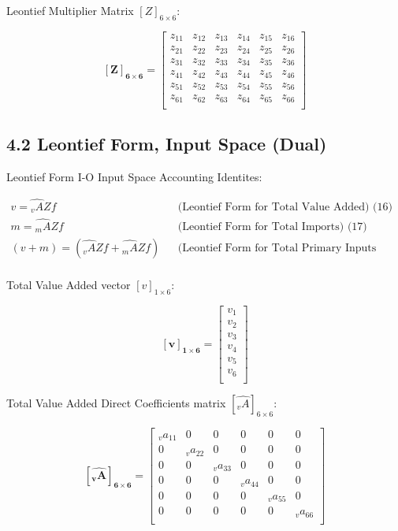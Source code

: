 \documentclass[
  letterpaper,
  DIV=11,
  numbers=noendperiod]{scrreprt}
\begin{document}
Leontief Multiplier Matrix \([Z]_{6\times 6}\):

\[\mathbf{[Z]_{6\times 6}} = \left[\begin{array}
{rrr}
z_{11} & z_{12} & z_{13} & z_{14} & z_{15} & z_{16} \\
z_{21} & z_{22} & z_{23} & z_{24} & z_{25} & z_{26} \\
z_{31} & z_{32} & z_{33} & z_{34} & z_{35} & z_{36} \\
z_{41} & z_{42} & z_{43} & z_{44} & z_{45} & z_{46} \\
z_{51} & z_{52} & z_{53} & z_{54} & z_{55} & z_{56} \\
z_{61} & z_{62} & z_{63} & z_{64} & z_{65} & z_{66} \\
\end{array}\right]
\]

\subsection{4.2 Leontief Form, Input Space
(Dual)}\label{leontief-form-input-space-dual}

Leontief Form I-O Input Space Accounting Identites:

\[
\begin{align}
    v = \widehat{_{v}A}Zf && \text{(Leontief Form for Total Value Added) (16)}\\
    m = \widehat{_{m}A}Zf && \text{(Leontief Form for Total Imports) (17)}\\
    (v+m) = (\widehat{_{v}A}Zf+\widehat{_{m}A}Zf) && \text{(Leontief Form for Total Primary Inputs (v+m)) (18)}\\
\end{align}
\]

Total Value Added vector \([v]_{1\times 6}\):

\[\mathbf{[v]_{1\times 6}} = \left[\begin{array}
{rrr}
v_{1} \\
v_{2} \\
v_{3} \\
v_{4} \\
v_{5} \\
v_{6} \\
\end{array}\right]
\]

Total Value Added Direct Coefficients matrix
\([\widehat{_{v}A}]_{6\times 6}\):

\[\mathbf {[\widehat{_{v}A}]_{6\times 6}} = \left[\begin{array}
{rrr}
_{v}a_{11} & 0 & 0 & 0 & 0 & 0 \\
0 & _{v}a_{22} & 0 & 0 & 0 & 0 \\
0 & 0 & _{v}a_{33} & 0 & 0 & 0 \\
0 & 0 & 0 & _{v}a_{44} & 0 & 0 \\
0 & 0 & 0 & 0 & _{v}a_{55} & 0 \\
0 & 0 & 0 & 0 & 0 & _{v}a_{66} \\
\end{array}\right]
\]
\end{document}
